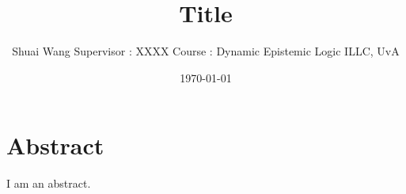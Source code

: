 \documentclass[12pt]{article}
\title{Title}
\author{Shuai Wang \newline Supervisor : XXXX
\newline Course       : Dynamic Epistemic Logic \newline ILLC, UvA }
\date{\today}
\theoremstyle{definition}
\newcommand{\keywords}[1]{\par\addvspace\baselineskip
\noindent\keywordname\enspace\ignorespaces#1}
\begin{document}
\maketitle

\tableofcontents
\clearpage










\section*{Abstract}
I am an abstract.

\newpage
\end{document}
